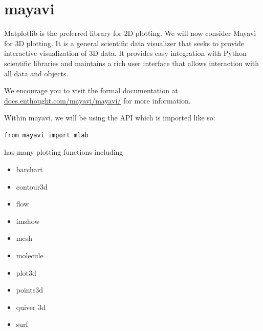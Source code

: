 \section*{mayavi}

Matplotlib is the preferred library for 2D plotting. We will now
consider Mayavi for 3D plotting. It is a general scientific data
visualizer that seeks to provide interactive visualization of 3D data.
It provides easy integration with Python scientific libraries and
maintains a rich user interface that allows interaction with all data
and objects.

We encourage you to visit the formal documentation at
\url{docs.enthought.com/mayavi/mayavi/} for more information. 

Within mayavi, we will be using the  API which is imported like so:
\begin{lstlisting}
from mayavi import mlab
\end{lstlisting}

 has many plotting functions including

\begin{itemize}
\item barchart
\item contour3d
\item flow
\item imshow
\item mesh
\item molecule
\item plot3d
\item points3d
\item quiver 3d
\item surf
\end{itemize}

